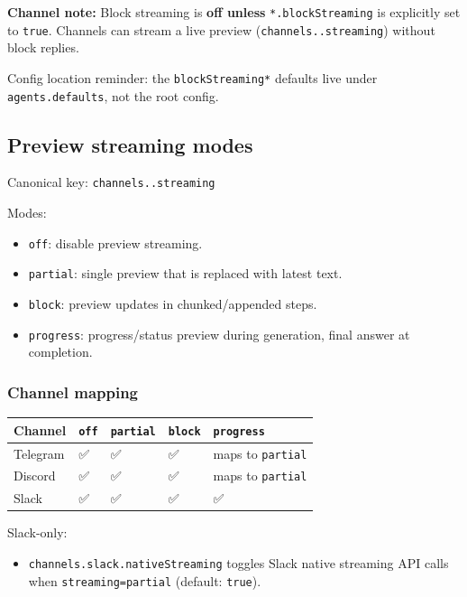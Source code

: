 \textbf{Channel note:} Block streaming is \textbf{off unless}
\texttt{*.blockStreaming} is explicitly set to \texttt{true}. Channels can stream a live preview
(\texttt{channels..streaming}) without block replies.

Config location reminder: the \texttt{blockStreaming*} defaults live under
\texttt{agents.defaults}, not the root config.

\subsection{Preview streaming modes}


Canonical key: \texttt{channels..streaming}

Modes:

\begin{itemize}
  \item \texttt{off}: disable preview streaming.
  \item \texttt{partial}: single preview that is replaced with latest text.
  \item \texttt{block}: preview updates in chunked/appended steps.
  \item \texttt{progress}: progress/status preview during generation, final answer at completion.
\end{itemize}


\subsubsection{Channel mapping}



\begin{table}[h]
\centering
\small
\begin{tabular}{|l|l|l|l|l|}
\hline
Channel & \texttt{off} & \texttt{partial} & \texttt{block} & \texttt{progress} \\
\hline
Telegram & ✅ & ✅ & ✅ & maps to \texttt{partial} \\
\hline
Discord & ✅ & ✅ & ✅ & maps to \texttt{partial} \\
\hline
Slack & ✅ & ✅ & ✅ & ✅ \\
\hline
\end{tabular}
\end{table}



Slack-only:

\begin{itemize}
  \item \texttt{channels.slack.nativeStreaming} toggles Slack native streaming API calls when \texttt{streaming=partial} (default: \texttt{true}).
\end{itemize}


